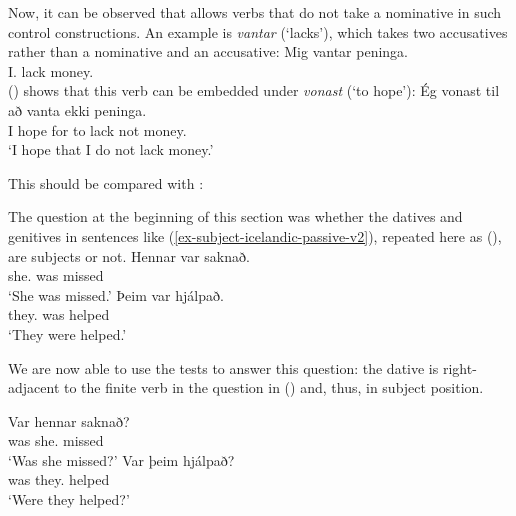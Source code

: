 Now, it can be observed that  allows verbs that do not take a nominative in such control
constructions. An example is \emph{vantar} (`lacks'), which takes two accusatives rather than a
nominative and an accusative:
\ea
\gll Mig      vantar peninga.\\
     I.\ACC{} lack   money.\ACC\\\icelandic
\z
() shows that this verb can be embedded under \emph{vonast} (`to hope'):
\ea
\gll Ég vonast til að vanta ekki peninga.\\
     I  hope   for to lack  not  money.\ACC\\\icelandic
\glt `I hope that I do not lack money.'
\z

This should be compared with :
\eal
{}
\zl

\noindent
The question at the beginning of this section was whether the datives and genitives in sentences
like (\ref{ex-subject-icelandic-passive-v2}), repeated here as (), are subjects or not.
\eal
\ex 
\gll Hennar     var saknað.\\
     she.\GEN{} was missed\\\icelandic
\glt `She was missed.'
\ex 
\gll Þeim        var hjálpað.\\
     they.\DAT{} was helped\\
\glt `They were helped.'
\zl

\noindent
We are now able to use the tests to answer this question: the dative is right-adjacent to the finite
verb in the question in () and, thus, in subject position.

\eal
\ex 
\gll Var hennar saknað?\\
     was she.\GEN{} missed\\\icelandic
\glt `Was she missed?'
\ex
\gll Var þeim       hjálpað?\\
     was they.\DAT{} helped   \\
\glt `Were they helped?'
\zl



